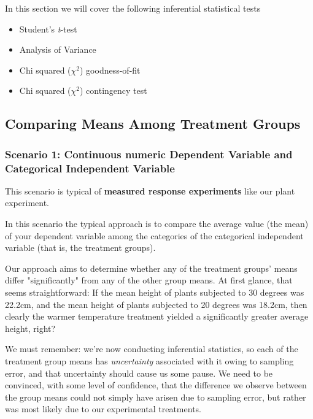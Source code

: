 \documentclass[
]{book}
\providecommand{\tightlist}{%
  \setlength{\itemsep}{0pt}\setlength{\parskip}{0pt}}
\begin{document}
In this section we will cover the following inferential statistical tests

\begin{itemize}
\tightlist
\item
  Student's \emph{t}-test
\item
  Analysis of Variance
\item
  Chi squared (\(\chi{^2}\)) goodness-of-fit
\item
  Chi squared (\(\chi{^2}\)) contingency test
\end{itemize}

\hypertarget{comparing-means-among-treatment-groups}{%
\subsection*{Comparing Means Among Treatment Groups}\label{comparing-means-among-treatment-groups}}

\hypertarget{scenario-1-continuous-numeric-dependent-variable-and-categorical-independent-variable}{%
\subsubsection*{Scenario 1: Continuous numeric Dependent Variable and Categorical Independent Variable}\label{scenario-1-continuous-numeric-dependent-variable-and-categorical-independent-variable}}

This scenario is typical of \textbf{measured response experiments} like our plant experiment.

In this scenario the typical approach is to compare the average value (the mean) of your dependent variable among the categories of the categorical independent variable (that is, the treatment groups).

Our approach aims to determine whether any of the treatment groups' means differ "significantly" from any of the other group means. At first glance, that seems straightforward: If the mean height of plants subjected to 30 degrees was 22.2cm, and the mean height of plants subjected to 20 degrees was 18.2cm, then clearly the warmer temperature treatment yielded a significantly greater average height, right?

We must remember: we're now conducting inferential statistics, so each of the treatment group means has \emph{uncertainty} associated with it owing to sampling error, and that uncertainty should cause us some pause. We need to be convinced, with some level of confidence, that the difference we observe between the group means could not simply have arisen due to sampling error, but rather was most likely due to our experimental treatments.
\end{document}
